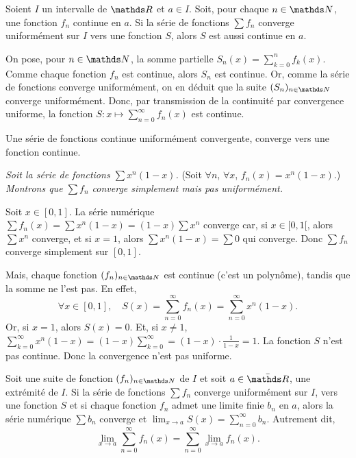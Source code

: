 \begin{thm}
	Soient $I$\/ un intervalle de $\R$\/ et $a \in I$. Soit, pour chaque $n \in \N$, une fonction $f_n$\/ continue en $a$. Si la série de fonctions $\sum f_n$\/ converge uniformément sur $I$\/ vers une fonction $S$, alors $S$\/ est aussi continue en $a$.
\end{thm}

\begin{prv}
	On pose, pour $n \in \N$, la somme partielle $S_n(x) = \sum_{k=0}^n f_k(x)$. Comme chaque fonction $f_n$\/ est continue, alors $S_n$\/ est continue. Or, comme la série de fonctions converge uniformément, on en déduit que la suite $(S_n)_{n\in\N}$\/ converge uniformément. Donc, par transmission de la continuité par convergence uniforme, la fonction $S: x\mapsto \sum_{n=0}^\infty f_n(x)$ est continue.
\end{prv}

\begin{crlr}
	Une série de fonctions continue uniformément convergente, converge vers une fonction continue.
\end{crlr}

\begin{exo}
	\textsl{Soit la série de fonctions $\sum x^n (1-x)$.} {\color{gray}(Soit $\forall n$, $\forall x$, $f_n(x) = x^n (1-x)$.)} \textsl{Montrons que $\sum f_n$\/ converge simplement mais pas uniformément.}

	Soit $x \in [0,1]$. La série numérique $\sum f_n(x) = \sum x^n (1-x) = (1-x) \sum x^n$\/ converge car, si $x \in [0,1[$, alors $\sum x^n$\/ converge, et si $x = 1$, alors $\sum x^n (1-x) = \sum 0$\/ qui converge. Donc $\sum f_n$\/ converge simplement sur $[0,1]$.

	Mais, chaque fonction $(f_n)_{n\in\N}$\/ est continue (c'est un polynôme), tandis que la somme ne l'est pas. En effet, \[
		\forall x \in [0,1],\quad S(x) = \sum_{n=0}^{\infty} f_n(x) = \sum_{n=0}^\infty x^n (1-x)
	.\] Or, si $x = 1$, alors $S(x) = 0$. Et, si $x \neq 1$, $\sum_{k=0}^{\infty} x^n (1-x) = (1-x) \sum_{k=0}^\infty = (1-x) \cdot \frac{1}{1-x} = 1$. La fonction $S$\/ n'est pas continue. Donc la convergence n'est pas uniforme.
\end{exo}

\begin{thm}
	Soit une suite de fonction $(f_n)_{n\in\N}$\/ de $I$\/ et soit $a \in \bar{\R}$, une extrémité de $I$. Si la série de fonctions $\sum f_n$\/ converge uniformément sur $I$, vers une fonction $S$\/ et si chaque fonction $f_n$\/ admet une limite finie $b_n$\/ en $a$, alors la série numérique $\sum b_n$\/ converge et $\lim_{x\to a}S(x) = \sum_{n=0}^\infty b_n$. Autrement dit, \[
		\lim_{x\to a}\sum_{n=0}^\infty f_n(x) = \sum_{n=0}^\infty \lim_{x\to a}f_n(x)
	.\]
\end{thm}

